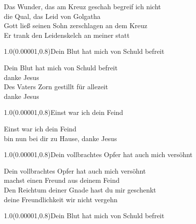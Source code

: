 \documentclass[aspectratio=169]{beamer}
\begin{document}
\color{white}
\begin{frame}
\centering
\color{white}
\huge{Das Wunder, das am Kreuz geschah begreif ich nicht} \\
\huge{die Qual, das Leid von Golgatha} \\
\huge{Gott ließ seinen Sohn zerschlagen an dem Kreuz} \\
\huge{Er trank den Leidenskelch an meiner statt} \\

\begin{textblock}{1.0}(0.00001,0.8)\color{gray}\normalsize{Dein Blut hat mich von Schuld befreit}\end{textblock}
\end{frame}

\begin{frame}
\centering
\color{white}
\huge{Dein Blut hat mich von Schuld befreit} \\
\huge{danke Jesus} \\
\huge{Des Vaters Zorn gestillt für allezeit} \\
\huge{danke Jesus} \\

\begin{textblock}{1.0}(0.00001,0.8)\color{gray}\normalsize{Einst war ich dein Feind}\end{textblock}
\end{frame}

\begin{frame}
\centering
\color{white}
\huge{Einst war ich dein Feind} \\
\huge{bin nun bei dir zu Hause, danke Jesus} \\

\begin{textblock}{1.0}(0.00001,0.8)\color{gray}\normalsize{Dein vollbrachtes Opfer hat auch mich versöhnt}\end{textblock}
\end{frame}

\begin{frame}
\centering
\color{white}
\huge{Dein vollbrachtes Opfer hat auch mich versöhnt} \\
\huge{machst einen Freund aus deinem Feind} \\
\huge{Den Reichtum deiner Gnade hast du mir geschenkt} \\
\huge{deine Freundlichkeit wir nicht vergehn} \\

\begin{textblock}{1.0}(0.00001,0.8)\color{gray}\normalsize{Dein Blut hat mich von Schuld befreit}\end{textblock}
\end{frame}
\end{document}
